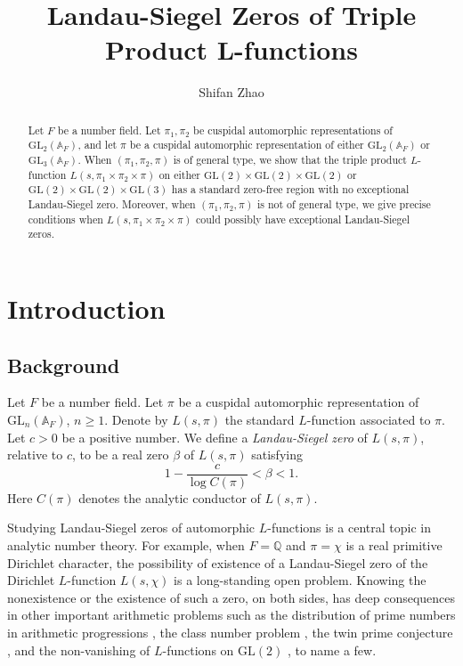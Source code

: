 \documentclass[12pt]{amsart}
\title{Landau-Siegel Zeros of Triple Product L-functions}
\author{Shifan Zhao}
\newcommand{\bA}{\mathbb{A}}
\newcommand{\bQ}{\mathbb{Q}}
\newcommand{\GL}{\text{GL}}
\begin{document}
\begin{abstract}
    Let $F$ be a number field. Let $\pi_1,\pi_2$ be cuspidal automorphic representations of $\GL_2(\bA_F)$, and let $\pi$ be a cuspidal automorphic representation of either $\GL_2(\bA_F)$ or $\GL_3(\bA_F)$. When $(\pi_1,\pi_2,\pi)$ is of general type, we show that the triple product $L$-function $L(s,\pi_1 \times \pi_2 \times \pi)$ on either $\GL(2) \times \GL(2) \times \GL(2)$ or $\GL(2) \times \GL(2) \times \GL(3)$ has a standard zero-free region with no exceptional Landau-Siegel zero. Moreover, when $(\pi_1,\pi_2,\pi)$ is not of general type, we give precise conditions when $L(s,\pi_1 \times \pi_2 \times \pi)$ could possibly have exceptional Landau-Siegel zeros. 
\end{abstract}

\maketitle

\tableofcontents

\section{Introduction}

\subsection{Background}
Let $F$ be a number field. Let $\pi$ be a cuspidal automorphic representation of $\GL_n(\bA_F)$, $n \geq 1$. Denote by $L(s,\pi)$ the standard $L$-function associated to $\pi$. Let $c>0$ be a positive number. We define a \textit{Landau-Siegel zero} of $L(s,\pi)$, relative to $c$, to be a real zero $\beta$ of $L(s,\pi)$ satisfying
\begin{equation*}
    1-\frac{c}{\log C(\pi)} < \beta < 1.
\end{equation*}
Here $C(\pi)$ denotes the analytic conductor of $L(s,\pi)$.

Studying Landau-Siegel zeros of automorphic $L$-functions is a central topic in analytic number theory. For example, when $F = \bQ$ and $\pi = \chi$ is a real primitive Dirichlet character, the possibility of existence of a Landau-Siegel zero of the Dirichlet $L$-function $L(s,\chi)$ is a long-standing open problem. Knowing the nonexistence or the existence of such a zero, on both sides, has deep consequences in other important arithmetic problems such as the distribution of prime numbers in arithmetic progressions \cite{Davenportbook}, the class number problem \cite{Davenportbook}, the twin prime conjecture \cite{Heath-Brown1983}, and the non-vanishing of $L$-functions on $\GL(2)$ \cite{IwaniecSarnak2000}, to name a few.
\end{document}
